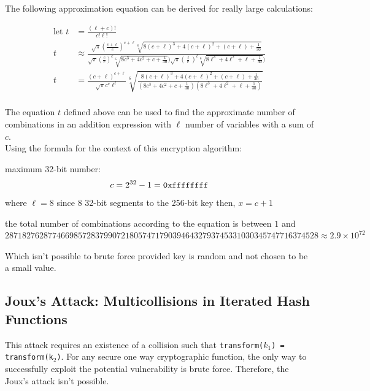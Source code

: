 \documentclass[11pt]{article}
\theoremstyle{definition}
\theoremstyle{remark}
\begin{document}
The following approximation equation can be derived for really large calculations:

\begin{align*} %
\text{let   } t &= \frac{(\ell+c)!}{c!\ell!}
\\ t &\approx \frac{\sqrt{\pi}\left(\frac{c+\ell}{e}\right)^{c+\ell}\sqrt[6]{8(c+\ell)^3 + 4(c+\ell)^2 + (c+\ell) + \frac{1}{30}}}{\sqrt{\pi}(\frac{c}{e})^c\sqrt[6]{8c^3 + 4c^2 + c + \frac{1}{30}})\sqrt{\pi}(\frac{\ell}{e})^\ell\sqrt[6]{8\ell^3 + 4\ell^2 + \ell + \frac{1}{30}})}
\\ t &= \frac{(c+\ell)^{c+\ell}}{\sqrt{\pi}c^{c}\ell^{\ell}}\sqrt[6]{\frac{8(c+\ell)^3 + 4(c+\ell)^2 + (c+\ell) + \frac{1}{30}}{\left(8c^3 + 4c^2 + c + \frac{1}{30}\right)\left(8\ell^3 + 4\ell^2 + \ell + \frac{1}{30}\right)}}
\end{align*}
\\

The equation $t$ defined above can be used to find the approximate number of combinations in an addition expression with $\ell$ number of variables with a sum of $c$.
\\

Using the formula for the context of this encryption algorithm:

maximum 32-bit number:
\[
\\ c = 2^{32}-1 = \texttt{0xffffffff}
\]
where $\ell=8$ since 8 32-bit segments to the 256-bit key
then, $x = c + 1$

the total number of combinations according to the equation is between $1$ and \\$2871827628774669857283799072180574717903946432793745331030345747716374528 \approx 2.9 \times 10^{72}$

Which isn't possible to brute force provided key is random and not chosen to be a small value.

\subsection{Joux's Attack: Multicollisions in Iterated Hash Functions}

This attack requires an existence of a collision such that \texttt{transform($k_1$) = transform(k$_2$)}. For any secure one way cryptographic function, the only way to successfully exploit the potential vulnerability is brute force. Therefore, the Joux's attack \cite{joux_attack} isn't possible.
\end{document}
